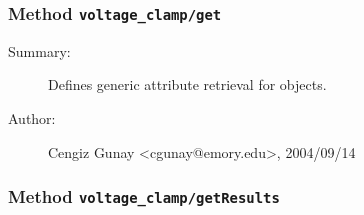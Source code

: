 \subsubsection[Method \texttt{get}]{Method \texttt{voltage\_clamp/get}}%
%
\label{ref_voltage_clamp__get}%
\hypertarget{ref_voltage_clamp__get}{}%
\begin{description}
\item[Summary:]Defines generic attribute retrieval for objects.
%
%
%
%
%
%
%
\item[Author:]%
Cengiz Gunay <cgunay@emory.edu>, 2004/09/14
%
\end{description}
\methodline%
\subsubsection[Method \texttt{getResults}]{Method \texttt{voltage\_clamp/getResults}}%
%
\label{ref_voltage_clamp__getResults}%
\hypertarget{ref_voltage_clamp__getResults}{}%
